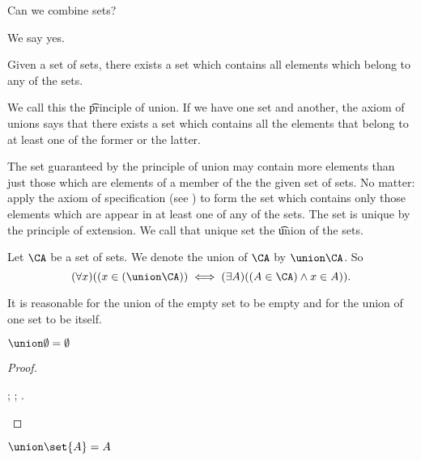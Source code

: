 

Can we combine sets?


We say yes.

\begin{principle}[Union]
	Given a set of sets, there exists a set which contains all elements which belong to any of the sets.	
\end{principle}
We call this the \t{principle of union}.
If we have one set and another, the axiom of unions says that there exists a set which contains all the elements that belong to at least one of the former or the latter.

The set guaranteed by the principle of union may contain more elements than just those which are elements of a member of the the given set of sets.
No matter: apply the axiom of specification (see ) to form the set which contains only those elements which are appear in at least one of any of the sets.
The set is unique by the principle of extension.
We call that unique set the \t{union} of the sets.


Let $\CA$ be a set of sets.
We denote the union of $\CA$ by $\union \CA$.
So 
\[
	(\forall x)((x \in (\union\CA)) \iff (\exists A)((A \in \CA) \land x \in A)).
\]


It is reasonable for the union of the empty set to be empty and for the union of one set to be itself.

\begin{prop}
	$\union \emptyset = \emptyset$
\end{prop}
\begin{proof}
	\begin{caccount}
		;
		;
		\cthus{}{$\union\emptyset = \emptyset$}{\eqref{myref}}.
	\end{caccount}
\end{proof}

\begin{prop}
	$\union \set{A} = A$
\end{prop}